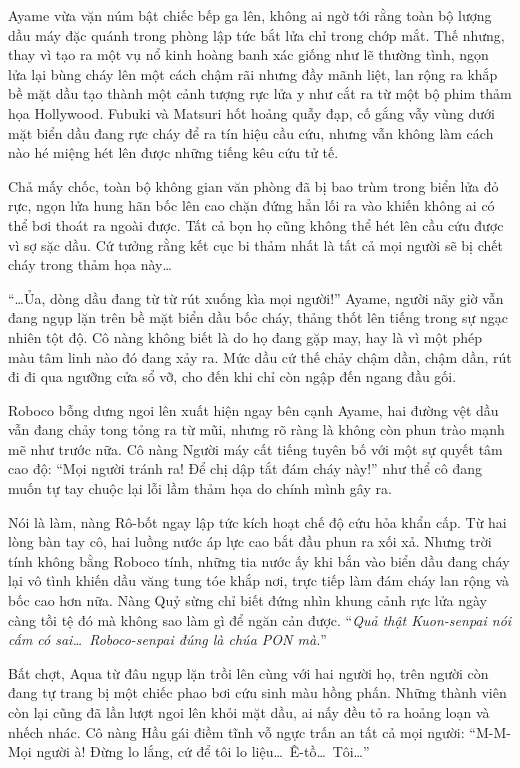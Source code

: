 \documentclass[../main.tex]{subfiles}
\begin{document}
Ayame vừa vặn núm bật chiếc bếp ga lên, không ai ngờ tới rằng toàn bộ lượng dầu máy đặc quánh trong phòng lập tức bắt lửa chỉ trong chớp mắt. Thế nhưng, thay vì tạo ra một vụ nổ kinh hoàng banh xác giống như lẽ thường tình, ngọn lửa lại bùng cháy lên một cách chậm rãi nhưng đầy mãnh liệt, lan rộng ra khắp bề mặt dầu tạo thành một cảnh tượng rực lửa y như cắt ra từ một bộ phim thảm họa Hollywood. Fubuki và Matsuri hốt hoảng quẫy đạp, cố gắng vẫy vùng dưới mặt biển dầu đang rực cháy để ra tín hiệu cầu cứu, nhưng vẫn không làm cách nào hé miệng hét lên được những tiếng kêu cứu tử tế.

Chả mấy chốc, toàn bộ không gian văn phòng đã bị bao trùm trong biển lửa đỏ rực, ngọn lửa hung hãn bốc lên cao chặn đứng hẳn lối ra vào khiến không ai có thể bơi thoát ra ngoài được. Tất cả bọn họ cũng không thể hét lên cầu cứu được vì sợ sặc dầu. Cứ tưởng rằng kết cục bi thảm nhất là tất cả mọi người sẽ bị chết cháy trong thảm họa này\dots

``\dots Ủa, dòng dầu đang từ từ rút xuống kìa mọi người!'' Ayame, người nãy giờ vẫn đang ngụp lặn trên bề mặt biển dầu bốc cháy, thảng thốt lên tiếng trong sự ngạc nhiên tột độ. Cô nàng không biết là do họ đang gặp may, hay là vì một phép màu tâm linh nào đó đang xảy ra. Mức dầu cứ thế chảy chậm dần, chậm dần, rút đi đi qua ngưỡng cửa sổ vỡ, cho đến khi chỉ còn ngập đến ngang đầu gối.

Roboco bỗng dưng ngoi lên xuất hiện ngay bên cạnh Ayame, hai đường vệt dầu vẫn đang chảy tong tỏng ra từ mũi, nhưng rõ ràng là không còn phun trào mạnh mẽ như trước nữa. Cô nàng Người máy cất tiếng tuyên bố với một sự quyết tâm cao độ: ``Mọi người tránh ra! Để chị dập tắt đám cháy này!'' như thể cô đang muốn tự tay chuộc lại lỗi lầm thảm họa do chính mình gây ra.

Nói là làm, nàng Rô-bốt ngay lập tức kích hoạt chế độ cứu hỏa khẩn cấp. Từ hai lòng bàn tay cô, hai luồng nước áp lực cao bắt đầu phun ra xối xả. Nhưng trời tính không bằng Roboco tính, những tia nước ấy khi bắn vào biển dầu đang cháy lại vô tình khiến dầu văng tung tóe khắp nơi, trực tiếp làm đám cháy lan rộng và bốc cao hơn nữa. Nàng Quỷ sừng chỉ biết đứng nhìn khung cảnh rực lửa ngày càng tồi tệ đó mà không sao làm gì để ngăn cản được. ``\textit{Quả thật Kuon-senpai nói cấm có sai\dots\ Roboco-senpai đúng là chúa PON mà.}''

Bất chợt, Aqua từ đâu ngụp lặn trồi lên cùng với hai người họ, trên người còn đang tự trang bị một chiếc phao bơi cứu sinh màu hồng phấn. Những thành viên còn lại cũng đã lần lượt ngoi lên khỏi mặt dầu, ai nấy đều tỏ ra hoảng loạn và nhếch nhác. Cô nàng Hầu gái điềm tĩnh vỗ ngực trấn an tất cả mọi người: ``M-M-Mọi người à! Đừng lo lắng, cứ để tôi lo liệu\dots\ Ê-tồ\dots\ Tôi\dots''
\end{document}
